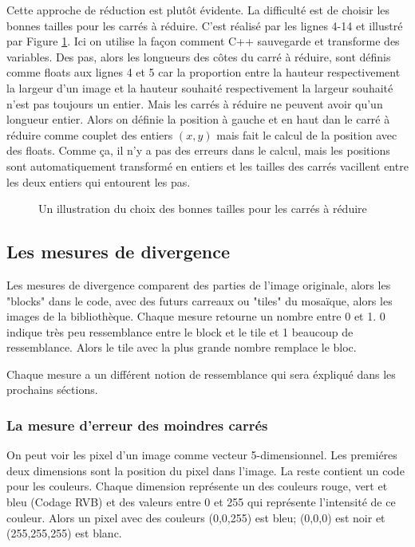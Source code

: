 \documentclass[a4paper]{article}
\begin{document}
Cette approche de r\'eduction est plut\^ot \'evidente. La difficult\'e est de choisir les bonnes tailles pour les carr\'es \`a r\'eduire.
C'est r\'ealis\'e par les lignes 4-14 et illustr\'e par Figure \ref{fig:carres}.
Ici on utilise la fa\c{c}on comment C++ sauvegarde et transforme des variables.
Des pas, alors les longueurs des c\^otes du carr\'e \`a r\'eduire,  sont d\'efinis comme floats aux lignes 4 et 5 car la proportion entre la hauteur respectivement la largeur d'un image et la hauteur souhait\'e respectivement la largeur souhait\'e n'est pas toujours un entier.
Mais les carr\'es \`a r\'eduire ne peuvent avoir qu'un longueur entier.
Alors on d\'efinie la position \`a gauche et en haut   dan le carr\'e \`a r\'eduire comme couplet des entiers $(x,y)$ mais fait le calcul de la position avec des floats.
Comme \c{c}a, il n'y a pas des erreurs dans le calcul, mais les positions sont automatiquement transform\'e en entiers et les tailles des carr\'es vacillent entre les deux entiers qui entourent les pas.
\begin{figure}
  \centerline{}
  \caption{Un illustration du choix des bonnes tailles pour les carr\'es \`a r\'eduire}
  \label{fig:carres}
\end{figure}

\subsection{Les mesures de divergence}
Les mesures de divergence comparent des parties de l'image originale, alors les "blocks" dans le code, avec des futurs carreaux ou "tiles" du mosa\"ique, alors les images de la biblioth\`eque.
Chaque mesure retourne un nombre entre 0 et 1.
0 indique tr\`es peu ressemblance entre le block et le tile et 1 beaucoup de ressemblance. 
Alors le tile avec la plus grande nombre remplace le bloc.

Chaque mesure a un différent notion de ressemblance qui sera \'expliqu\'e dans les prochains s\'ections.

\subsubsection{La mesure d'erreur des moindres carr\'es}

On peut voir les pixel d'un image comme vecteur 5-dimensionnel.
Les premi\'eres deux dimensions sont la position du pixel dans l'image.
La reste contient un code pour les couleurs. Chaque dimension repr\'esente un des couleurs rouge, vert et bleu (Codage RVB) et des valeurs entre 0 et 255 qui repr\'esente l'intensit\'e de ce couleur.
Alors un pixel avec des couleurs (0,0,255) est bleu;
(0,0,0) est noir et (255,255,255) est blanc.
\end{document}
